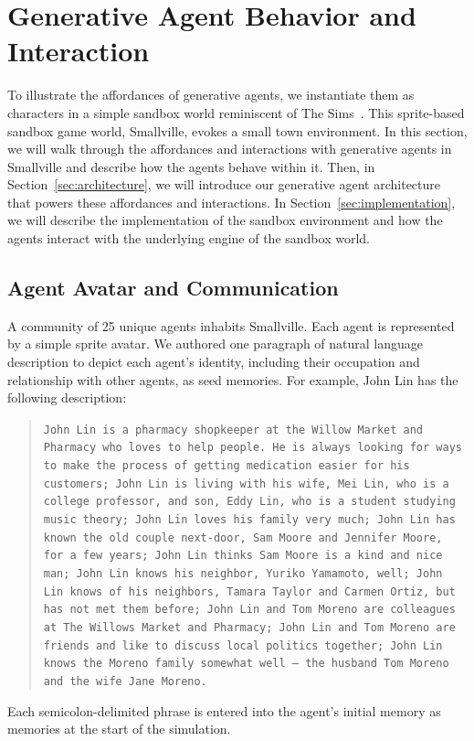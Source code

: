 

\section{Generative Agent Behavior and Interaction}\label{sec:behavior}
To illustrate the affordances of generative agents, we instantiate them as characters in a simple sandbox world reminiscent of The Sims~\cite{49_ElectronicArts2009Sims}. This sprite-based sandbox game world, Smallville, evokes a small town environment. In this section, we will walk through the affordances and interactions with generative agents in Smallville and describe how the agents behave within it. Then, in Section~\ref{sec:architecture}, we will introduce our generative agent architecture that powers these affordances and interactions. In Section~\ref{sec:implementation}, we will describe the implementation of the sandbox environment and how the agents interact with the underlying engine of the sandbox world.

\subsection{Agent Avatar and Communication}\label{sec:avatar}
A community of 25 unique agents inhabits Smallville. Each agent is represented by a simple sprite avatar. We authored one paragraph of natural language description to depict each agent's identity, including their occupation and relationship with other agents, as seed memories. For example, John Lin has the following description:
\begin{quote}
{\small
\texttt{John Lin is a pharmacy shopkeeper at the Willow Market and Pharmacy who loves to help people. He is always looking for ways to make the process of getting medi\-cation easier for his customers; John Lin is living with his wife, Mei Lin, who is a college professor, and son, Eddy Lin, who is a student studying music theory; John Lin loves his family very much; John Lin has known the old couple next-door, Sam Moore and Jennifer Moore, for a few years; John Lin thinks Sam Moore is a kind and nice man; John Lin knows his neighbor, Yuriko Yamamoto, well; John Lin knows of his neighbors, Tamara Taylor and Carmen Ortiz, but has not met them before; John Lin and Tom Moreno are colleagues at The Willows Market and Pharmacy; John Lin and Tom Moreno are friends and like to discuss local politics together; John Lin knows the Moreno family somewhat well — the husband Tom Moreno and the wife Jane Moreno.}
}
\end{quote}
Each semicolon-delimited phrase is entered into the agent's initial memory as memories at the start of the simulation. 

